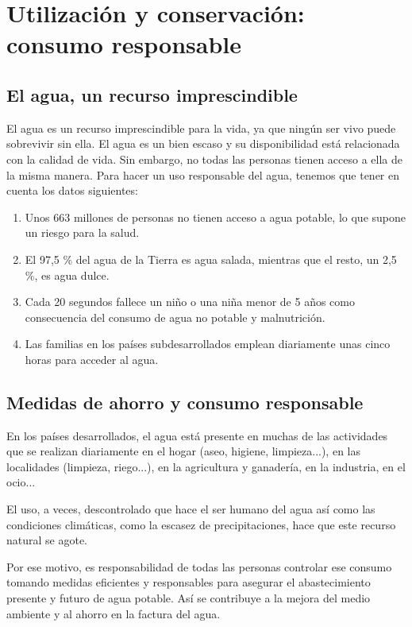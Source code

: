 \section{Utilización y conservación: consumo responsable}

\subsection{El agua, un recurso imprescindible}

El agua es un recurso imprescindible para la vida, ya que ningún ser vivo puede sobrevivir sin ella. El agua es un bien escaso y su disponibilidad está relacionada con la calidad de vida. Sin embargo, no todas las personas tienen acceso a ella de la misma manera. Para hacer un uso responsable del agua, tenemos que tener en cuenta los datos siguientes:

\begin{enumerate}
    \item Unos 663 millones de personas no tienen acceso a agua potable, lo que supone un riesgo para la salud.
    \item El 97,5 \% del agua de la Tierra es agua salada, mientras que el resto, un 2,5 \%, es agua dulce.
    \item Cada 20 segundos fallece un niño o una niña menor de 5 años como consecuencia del consumo de agua no potable y malnutrición.
    \item Las familias en los países subdesarrollados emplean diariamente unas cinco horas para acceder al agua.
\end{enumerate}

\subsection{Medidas de ahorro y consumo responsable}

En los países desarrollados, el agua está presente en muchas de las actividades que se realizan diariamente en el hogar (aseo, higiene, limpieza...), en las localidades (limpieza, riego...), en la agricultura y ganadería, en la industria, en el ocio...

\vspace{3mm}
El uso, a veces, descontrolado que hace el ser humano del agua así como las condiciones climáticas, como la escasez de precipitaciones, hace que este recurso natural se agote.

\vspace{3mm}
Por ese motivo, es responsabilidad de todas las personas controlar ese consumo tomando medidas eficientes y responsables para asegurar el abastecimiento presente y futuro de agua potable. Así se contribuye a la mejora del medio ambiente y al ahorro en la factura del agua.

